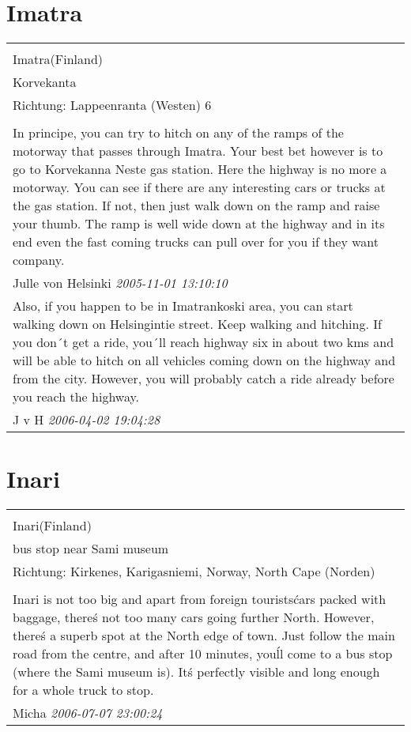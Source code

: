 \documentclass[a4paper,12pt]{article}
\begin{document}
\section{Imatra}
\begin{tabular}{|p{13cm}|}
\hline\\
Imatra(Finland)\\
Korvekanta\\
Richtung: Lappeenranta (Westen) 6 \\
\hline\\
In principe, you can try to hitch on any of the ramps of the motorway that passes through Imatra. Your best bet however is to go to Korvekanna Neste gas station. Here the highway is no more a motorway. You can see if there are any interesting cars or trucks at the gas station. If not, then just walk down on the ramp and raise your thumb. The ramp is well wide down at the highway and in its end even the fast coming trucks can pull over for you if they want company. \\
Julle von Helsinki \textit{ 2005-11-01 13:10:10 }\\\hline Also, if you happen to be in Imatrankoski area, you can start walking down on Helsingintie street. Keep walking and hitching. If you don´t get a ride, you´ll reach highway six in about two kms and will be able to hitch on all vehicles coming down on the highway and from the city. However, you will probably catch a ride already before you reach the highway. \\
J v H \textit{ 2006-04-02 19:04:28 }\\\hline
\end{tabular}


\section{Inari}
\begin{tabular}{|p{13cm}|}
\hline\\
Inari(Finland)\\
bus stop near Sami museum\\
Richtung: Kirkenes, Karigasniemi, Norway, North Cape (Norden) \\
\hline\\
Inari is not too big and apart from foreign tourists\' cars packed with baggage, there\'s not too many cars going further North. However, there\'s a superb spot at the North edge of town. Just follow the main road from the centre, and after 10 minutes, you\'ll come to a bus stop (where the Sami museum is). It\'s perfectly visible and long enough for a whole truck to stop. \\
Micha \textit{ 2006-07-07 23:00:24 }\\\hline
\end{tabular}
\end{document}
